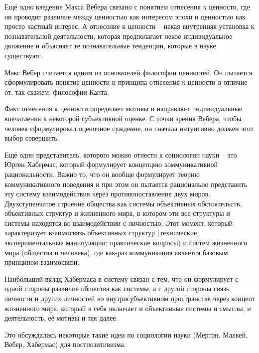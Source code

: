 \documentclass[main.tex]{subfiles}
\begin{document}


Ещё одно введение Макса Вебера связано с понятием отнесения к ценности, где он проводит различие между ценностью как интересом эпохи и ценностью как просто частный интерес.
А отнесение к ценности -- некая внутренняя установка к познавательной деятельности, которая предполагает некое индивидуальное движение и объясняет те познавательные тенденции, которые в науке существуют.

Макс Вебер считается одним из основателей философии ценностей.
Он пытается сформулировать понятие ценности и принципа отнесения к ценности в отличие от, так скажем, философии Канта.

Факт отнесения к ценности определяет мотивы и направляет индивидуальные впечатления к некоторой субъективной оценке.
С точки зрения Вебера, чтобы человек сформулировал оценочное суждение, он сначала интуитивно должен этот выбор совершить.



Ещё один представитель, которого можно отнести к социологии науки -- это Юрген Хабермас, который формулирует концепцию коммуникативной рациональности.
Важно то, что он вообще формулирует теорию коммуникативного поведения и при этом он пытается рационально представить эту систему взаимодействия через противопоставление двух миров.
Двухступенчатое строение общества как системы объективных обстоятельств, объективных структур и жизненного мира, в котором эти все структуры и системы находятся во взаимодействии с личностью.
Этот момент, который характеризует взаимосвязь объективных структур (технические, экспериментальные манипуляции; практические вопросы) и систем жизненного мира (общества и человека), где как-раз коммуникация является базовым принципом взаимосвязи.

Наибольший вклад Хабермаса в систему связан с тем, что он формулирует с одной стороны различие общества как системы, а с другой стороны связь личности и других личностей во внутрисубъективном пространстве через концепт жизненного мира, который в себя включает и объективные системы и смыслы, и деятельность, её мотивы и так далее.

Это обсуждались некоторые такие идеи по социологии науки (Мертон, Малкей, Вебер, Хабермас) для постпозитивизма. 
\end{document}
